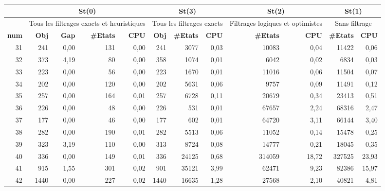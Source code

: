 \begin{table}[H]
	\centering
	\small
	\begin{tabular}{|r|rrrr|rrr|rr|rr|}
		\toprule
		\hline
		\rowcolor{cyan}	&\multicolumn{4}{c|}{\textbf{St(0)}} & \multicolumn{3}{c|}{\textbf{St(3)}}&\multicolumn{2}{c|}{\textbf{St(2)}}&\multicolumn{2}{c|}{\textbf{St(1)}} \\ \hline
		\midrule
		
		\hline
		\rowcolor{cyan}	&\multicolumn{4}{c|}{ \scriptsize{Tous les filtrages exacts et heuristiques}} & \multicolumn{3}{c|}{\scriptsize{Tous les filtrages exacts}}&\multicolumn{2}{c|}{\scriptsize{Filtrages logiques et optimistes}}&\multicolumn{2}{c|}{\scriptsize{Sans filtrage}}
		\\ \hline
		\midrule
		
		\rowcolor{cyan}	\textbf{num} &\textbf{Obj} & \textbf{Gap} & \textbf{\#Etats} & \textbf{CPU} &\textbf{Obj} & \textbf{\#Etats} & \textbf{CPU}  & \textbf{\#Etats} & \textbf{CPU}  & \textbf{\#Etats} & \textbf{CPU} \\ \hline
		\midrule
		31	&	241	&	0,00	&	131	&	0,00	&	241	&	3077	&	0,03	&	10083	&	0,04	&	11422	&	0,06	\\ \hline
		32	&	373	&	4,19	&	80	&	0,00	&	358	&	1074	&	0,01	&	6042	&	0,02	&	6834	&	0,03	\\ \hline
		33	&	223	&	0,00	&	56	&	0,00	&	223	&	1670	&	0,01	&	11016	&	0,06	&	11504	&	0,07	\\ \hline
		34	&	202	&	0,00	&	120	&	0,00	&	202	&	5631	&	0,06	&	9757	&	0,09	&	11491	&	0,12	\\ \hline
		35	&	257	&	0,00	&	164	&	0,01	&	257	&	6728	&	0,11	&	20679	&	0,34	&	23413	&	0,51	\\ \hline
		36	&	226	&	0,00	&	48	&	0,00	&	226	&	531	&	0,01	&	67657	&	2,24	&	68316	&	2,47	\\ \hline
		37	&	177	&	0,00	&	46	&	0,00	&	177	&	602	&	0,01	&	64720	&	3,11	&	66144	&	3,40	\\ \hline
		38	&	282	&	0,00	&	190	&	0,01	&	282	&	5513	&	0,06	&	11052	&	0,14	&	15478	&	0,25	\\ \hline
		39	&	323	&	3,19	&	110	&	0,00	&	313	&	8724	&	0,08	&	14777	&	0,21	&	18045	&	0,35	\\ \hline
		40	&	336	&	0,00	&	149	&	0,01	&	336	&	24125	&	0,68	&	314059	&	18,72	&	327525	&	23,93	\\ \hline
		41	&	915	&	1,55	&	301	&	0,02	&	901	&	35121	&	3,99	&	62471	&	9,23	&	82386	&	15,97	\\ \hline
		42	&	1440	&	0,00	&	227	&	0,02	&	1440	&	16635	&	1,28	&	27568	&	2,10	&	40821	&	4,81	\\ \hline

\end{tabular}
\end{table}
